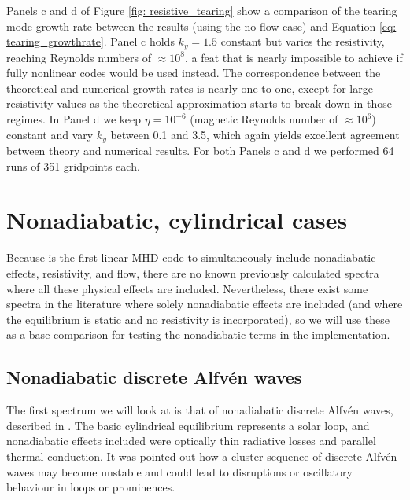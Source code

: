 Panels c and d of Figure \ref{fig: resistive_tearing} show a comparison of the tearing mode growth rate between the {\legolas} results (using the no-flow case) and Equation \eqref{eq: tearing_growthrate}. Panel c holds $k_y = 1.5$ constant but varies the resistivity, reaching Reynolds numbers of $\approx 10^8$, a feat that is nearly impossible to achieve if fully nonlinear codes would be used instead. The correspondence between the theoretical and numerical growth rates is nearly one-to-one, except for large resistivity values as the theoretical approximation starts to break down in those regimes. In Panel d we keep $\eta = 10^{-6}$ (magnetic Reynolds number of $\approx 10^6$) constant and vary $k_y$ between 0.1 and 3.5, which again yields excellent agreement between theory and numerical results. For both Panels c and d we performed 64 runs of 351 gridpoints each.



\section{Nonadiabatic, cylindrical cases}
Because {\legolas} is the first linear MHD code to simultaneously include nonadiabatic effects, resistivity, and flow, there are no known previously calculated spectra where all these physical effects are included. Nevertheless, there exist some spectra in the literature where solely nonadiabatic effects are included (and where the equilibrium is static and no resistivity is incorporated), so we will use these as a base comparison for testing the nonadiabatic terms in the implementation.

\subsection{Nonadiabatic discrete Alfv\'en waves}
The first spectrum we will look at is that of nonadiabatic discrete Alfv\'en waves, described in \citet{keppens1993}. The basic cylindrical equilibrium represents a solar loop, and nonadiabatic effects included were optically thin radiative losses and parallel thermal conduction. It was pointed out how a cluster sequence of discrete Alfv\'en waves may become unstable and could lead to disruptions or oscillatory behaviour in loops or prominences.

